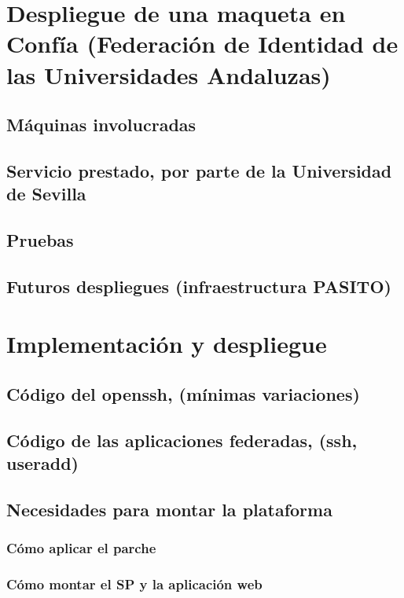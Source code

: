 

\tableofcontents








\chapter{Despliegue de una maqueta en Confía (Federación de Identidad de las Universidades Andaluzas)}
    \section{Máquinas involucradas}
    \section{Servicio prestado, por parte de la Universidad de Sevilla}
    \section{Pruebas}
    \section{Futuros despliegues (infraestructura PASITO)}

\chapter{Implementación y despliegue}
    \label{implementacion}
    \section{Código del openssh, (mínimas variaciones)}
    \section{Código de las aplicaciones federadas, (ssh, useradd)}
    \section{Necesidades para montar la plataforma}
        \subsection{Cómo aplicar el parche}
        \subsection{Cómo montar el SP y la aplicación web}
